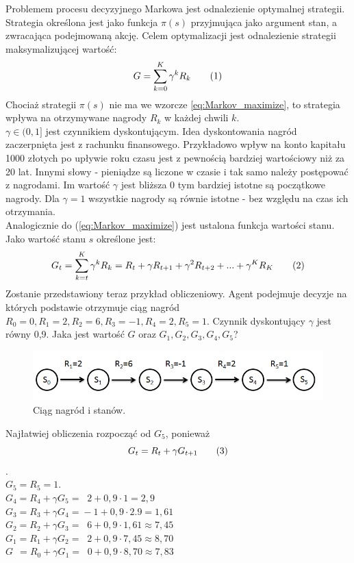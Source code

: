\documentclass[12pt]{book}
\theoremstyle{plain}
\newcommand\addtag{\refstepcounter{equation}
\renewcommand{\labelenumii}{\theenumii}
\renewcommand{\theenumii}{\theenumi.\arabic{enumii}.}
\tag{\theequation}}
\begin{document}
Problemem procesu decyzyjnego Markowa jest odnalezienie optymalnej strategii. Strategia określona jest jako funkcja $\pi(s)$ przyjmująca jako argument stan, a zwracająca podejmowaną akcję. Celem optymalizacji jest odnalezienie strategii maksymalizującej wartość:
\[
G=\sum_{k=0}^{K} \gamma^k R_{k} \addtag \label{eq:Markov_maximize}
\]
Chociaż strategii $\pi(s)$ nie ma we wzorcze \ref{eq:Markov_maximize}, to strategia wpływa na otrzymywane nagrody $R_{k}$ w każdej chwili $k$.\\
$\gamma \in (0,1]$ jest czynnikiem dyskontującym. Idea dyskontowania nagród zaczerpnięta jest z rachunku finansowego. Przykładowo wpływ na konto kapitału 1000 złotych po upływie roku czasu jest z pewnością bardziej wartościowy niż za 20 lat. Innymi słowy - pieniądze są liczone w czasie i tak samo należy postępować z nagrodami. Im wartość $\gamma$ jest bliższa 0 tym bardziej istotne są początkowe nagrody. Dla $\gamma=1$ wszystkie nagrody są równie istotne - bez względu na czas ich otrzymania.\\
Analogicznie do (\ref{eq:Markov_maximize}) jest ustalona funkcja wartości stanu. Jako wartość stanu $s$ określone jest:
\[
G_t=\sum_{k=t}^{K} \gamma^k R_{k}=R_{t}+\gamma R_{t+1}+\gamma^{2} R_{t+2}+...+\gamma^{K}R_K \addtag \label{eq:Markov_state_value_G}
\]
Zostanie przedstawiony teraz przykład obliczeniowy. Agent podejmuje decyzje na których podstawie otrzymuje ciąg  nagród $R_0=0, R_1=2,R_2=6,R_3=-1,R_4=2,R_5=1$. Czynnik dyskontujący $\gamma$ jest równy 0,9. Jaka jest wartość $G$ oraz $G_1,G_2,G_3,G_4,G_5$?\\
\begin{figure}[H]
	\centering
	\includegraphics[width=14cm]{rewards-graph}
	\caption{Ciąg nagród i stanów.}
	\label{fig:agent-srodowisko}
\end{figure}\noindent
Najłatwiej obliczenia rozpocząć od $G_5$, ponieważ
\[G_{t}=R_{t}+\gamma G_{t+1} \label{eq:G_reccurential} \addtag \].\\
$G_5=R_5=1$.\\
$G_4=R_4+\gamma G_{5}=\;\;2+0,9\cdot 1=2,9$\\
$G_3=R_3+\gamma G_{4}=\!-1+0,9\cdot2.9=1,61$\\
$G_2=R_2+\gamma G_{3}=\;\;6+0,9\cdot1,61 \approx 7,45$\\
$G_1=R_1+\gamma G_{2}=\;\;2+0,9\cdot 7,45 \approx 8,70$\\
$G\;\,=R_0+\gamma G_{1}=\;\;0+0,9\cdot 8,70 \approx 7,83$\\
\end{document}
